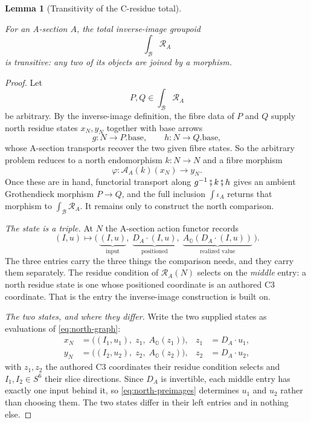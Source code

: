 \documentclass[11pt]{article}
\newcommand{\OO}{\mathbb{O}}
\providecommand{\lean}[1]{}
\providecommand{\leanok}{}
\providecommand{\uses}[1]{}
\theoremstyle{plain}
\newtheorem{lemma}[theorem]{Lemma}
\theoremstyle{definition}
\theoremstyle{remark}
\begin{document}
\begin{lemma}[Transitivity of the C-residue total]\label{lem:c-residue-transitive}
\lean{ASection.CResidueInputActionSquare,
ASection.CResidueInputFiberHom,
ASection.CResidueInputTotal_transitive,
ASection.sweepTransitive_on_residueSystem}
\leanok
\uses{def:A-section, def:base, def:residue-subdiagram, prop:weierstrass,
lem:residue-spheres, thm:G2-S6}
For an A-section $A$, the total inverse-image groupoid
\[
  \int_{\mathcal B}\mathcal R_A
\]
is transitive: any two of its objects are joined by a morphism.
\end{lemma}
\begin{proof}
Let
\[
  P,Q\in\int_{\mathcal B}\mathcal R_A
\]
be arbitrary. By the inverse-image definition, the fibre data of $P$ and $Q$
supply north residue states $x_N,y_N$ together with base arrows
\[
  g:N\longrightarrow P.\mathrm{base},\qquad
  h:N\longrightarrow Q.\mathrm{base},
\]
whose A-section transports recover the two given fibre states. So the arbitrary
problem reduces to a north endomorphism $k:N\to N$ and a fibre morphism
\[
  \varphi:\mathcal A_A(k)(x_N)\longrightarrow y_N .
\]
Once these are in hand, functorial transport along
$g^{-1}\fatsemi k\fatsemi h$ gives an ambient Grothendieck morphism $P\to Q$,
and the full inclusion $\int\iota_A$ returns that morphism to
$\int_{\mathcal B}\mathcal R_A$. It remains only to construct the north
comparison.

\medskip
\noindent\emph{The state is a triple.}
At $N$ the A-section action functor records
\[
  (I,u)\longmapsto
  \bigl(\,\underbrace{(I,u)}_{\text{input}},\;
        \underbrace{D_A\mathbin{\cdot}(I,u)}_{\text{positioned}},\;
        \underbrace{A_{\OO}(D_A\mathbin{\cdot}(I,u))}_{\text{realized value}}\,\bigr).
                                    \tag{A}\label{eq:north-graph}
\]
The three entries carry the three things the comparison needs, and they carry
them separately. The residue condition of $\mathcal R_A(N)$ selects on the
\emph{middle} entry: a north residue state is one whose positioned coordinate is
an authored C3 coordinate. That is the entry the inverse-image construction is
built on.

\medskip
\noindent\emph{The two states, and where they differ.}
Write the two supplied states as evaluations of \eqref{eq:north-graph}:
\[
\begin{aligned}
  x_N&=\bigl((I_1,u_1),\;z_1,\;A_{\OO}(z_1)\bigr),
    &z_1&=D_A\mathbin{\cdot}u_1,\\[0.5ex]
  y_N&=\bigl((I_2,u_2),\;z_2,\;A_{\OO}(z_2)\bigr),
    &z_2&=D_A\mathbin{\cdot}u_2,
\end{aligned}
                                    \tag{P}\label{eq:north-preimages}
\]
with $z_1,z_2$ the authored C3 coordinates their residue condition selects and
$I_1,I_2\in S^6$ their slice directions. Since $D_A$ is invertible, each middle
entry has exactly one input behind it, so \eqref{eq:north-preimages} determines
$u_1$ and $u_2$ rather than choosing them. The two states differ in their left
entries and in nothing else.


\end{proof}
\end{document}
